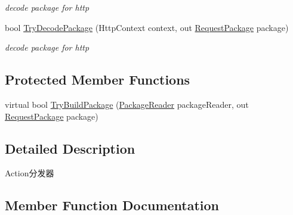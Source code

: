\begin{DoxyCompactItemize}
\begin{DoxyCompactList}\small\item\em decode package for http \end{DoxyCompactList}\item 
bool \mbox{\hyperlink{class_t_net_1_1_contract_1_1_scut_action_dispatcher_a1419151e61eeff45c912074bbf820c26}{Try\+Decode\+Package}} (Http\+Context context, out \mbox{\hyperlink{class_t_net_1_1_contract_1_1_request_package}{Request\+Package}} package)
\begin{DoxyCompactList}\small\item\em decode package for http \end{DoxyCompactList}\end{DoxyCompactItemize}
\subsection*{Protected Member Functions}
\begin{DoxyCompactItemize}
\item 
virtual bool \mbox{\hyperlink{class_t_net_1_1_contract_1_1_scut_action_dispatcher_a6aac3cd43dfe0c6e909878c46d83aaec}{Try\+Build\+Package}} (\mbox{\hyperlink{class_t_net_1_1_contract_1_1_package_reader}{Package\+Reader}} package\+Reader, out \mbox{\hyperlink{class_t_net_1_1_contract_1_1_request_package}{Request\+Package}} package)
\end{DoxyCompactItemize}


\subsection{Detailed Description}
Action分发器 



\subsection{Member Function Documentation}
\mbox{\label{class_t_net_1_1_contract_1_1_scut_action_dispatcher_adb33996b5f5bf5ad4ebf6ad59fa1f065}} 
